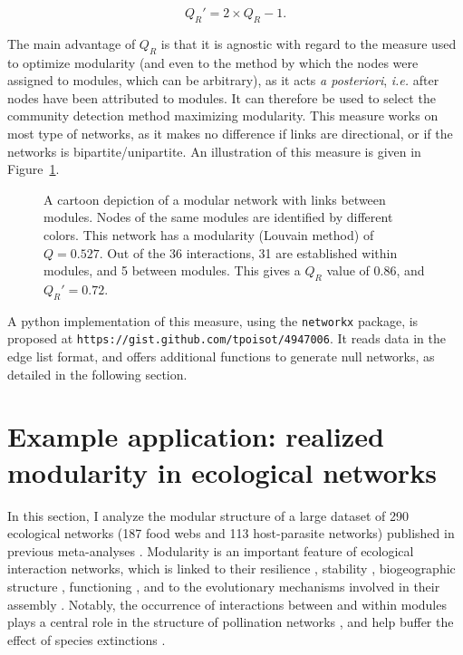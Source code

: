\documentclass[12pt,oneside]{article}
\begin{document}
\begin{equation}
	Q_R' = 2\times Q_R - 1 .
	\label{e:tqr}
\end{equation}

The main advantage of $Q_R$ is that it is agnostic with regard to the measure
used to optimize modularity (and even to the method by which the nodes were
assigned to modules, which can be arbitrary), as it acts \emph{a posteriori},
\emph{i.e.} after nodes have been attributed to modules. It can therefore be
used to select the community detection method maximizing modularity. This
measure works on most type of networks, as it makes no difference if links are
directional, or if the networks is bipartite/unipartite. An illustration of
this measure is given in Figure~\ref{f:illu}.

\begin{figure}[tb]
	\begin{center}
		
	\end{center}
	\caption{A cartoon depiction of a modular network with links between modules. Nodes of the same modules are identified by different colors. This network has a modularity (Louvain method) of $Q = 0.527$. Out of the 36 interactions, 31 are established within modules, and 5 between modules. This gives a $Q_R$ value of 0.86, and $Q_R' = 0.72$.}
	\label{f:illu}
\end{figure}

A python implementation of this measure, using the \texttt{networkx} package,
is proposed at \texttt{https://gist.github.com/tpoisot/4947006}. It reads data in the edge list
format, and offers additional functions to generate null networks, as detailed
in the following section.

\section{Example application: realized modularity in ecological networks}

In this section, I analyze the modular structure of a large dataset of 290
ecological networks (187 food webs and 113 host-parasite networks) published
in previous meta-analyses \cite{gravel_trophic_2011,poisot_dissimilarity_2012}. Modularity is an important feature of ecological interaction networks, which is linked to
their resilience \cite{fortuna_nestedness_2010,stouffer_compartmentalization_2011}, stability
\parencite{thebault_identifying_2012}, biogeographic structure \cite{flores_multi-scale_2012},
functioning \cite{thebault_food-web_2003}, and to the evolutionary mechanisms
involved in their assembly \cite{flores_statistical_2011}. Notably, the occurrence of
interactions between and within modules plays a central role in the structure
of pollination networks \parencite{olesen_modularity_2007}, and help buffer the effect of
species extinctions \parencite{stouffer_compartmentalization_2011}.
\end{document}
